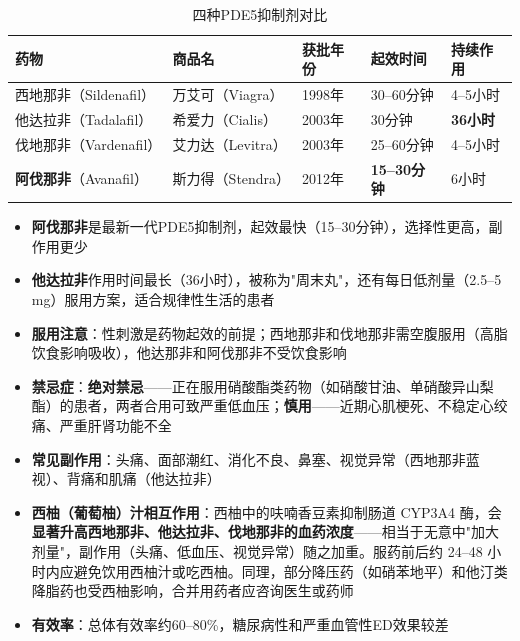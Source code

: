 \documentclass[12pt,a4paper,twoside]{ctexbook}
\begin{document}
\begin{table}[htbp]
\centering
\caption{四种PDE5抑制剂对比}
\label{tab:pde5_inhibitors}
\begin{tabularx}{\textwidth}{@{}lllll@{}}
    \toprule
    \textbf{药物} & \textbf{商品名} & \textbf{获批年份} & \textbf{起效时间} & \textbf{持续作用} \\
    \midrule
    西地那非\index{xidinafei@西地那非}（Sildenafil） & 万艾可（Viagra） & 1998年 & 30--60分钟 & 4--5小时 \\
    他达拉非\index{tadalafei@他达拉非}（Tadalafil） & 希爱力（Cialis） & 2003年 & 30分钟 & \textbf{36小时} \\
    伐地那非\index{fadinafei@伐地那非}（Vardenafil） & 艾力达（Levitra） & 2003年 & 25--60分钟 & 4--5小时 \\
    \textbf{阿伐那非\index{afanafei@阿伐那非}}（Avanafil） & 斯力得（Stendra） & 2012年 & \textbf{15--30分钟} & 6小时 \\
    \bottomrule
\end{tabularx}
\end{table}

\begin{itemize}[leftmargin=2cm]
	\item \textbf{阿伐那非}是最新一代PDE5抑制剂，起效最快（15--30分钟），选择性更高，副作用更少
	\item \textbf{他达拉非}作用时间最长（36小时），被称为"周末丸"，还有每日低剂量（2.5--5 mg）服用方案，适合规律性生活的患者
	\item \textbf{服用注意}：性刺激是药物起效的前提；西地那非和伐地那非需空腹服用（高脂饮食影响吸收），他达那非和阿伐那非不受饮食影响
	\item \textbf{禁忌症}：\textbf{绝对禁忌}——正在服用硝酸酯类药物（如硝酸甘油、单硝酸异山梨酯）的患者，两者合用可致严重低血压；\textbf{慎用}——近期心肌梗死、不稳定心绞痛、严重肝肾功能不全
	\item \textbf{常见副作用}：头痛、面部潮红、消化不良、鼻塞、视觉异常（西地那非蓝视）、背痛和肌痛（他达拉非）
	\item \textbf{西柚（葡萄柚）汁相互作用}：西柚中的呋喃香豆素抑制肠道 CYP3A4 酶，会\textbf{显著升高西地那非、他达拉非、伐地那非的血药浓度}——相当于无意中"加大剂量"，副作用（头痛、低血压、视觉异常）随之加重。服药前后约 24--48 小时内应避免饮用西柚汁或吃西柚。同理，部分降压药（如硝苯地平）和他汀类降脂药也受西柚影响，合并用药者应咨询医生或药师
	\item \textbf{有效率}：总体有效率约60--80\%，糖尿病性和严重血管性ED效果较差
\end{itemize}
\end{document}
